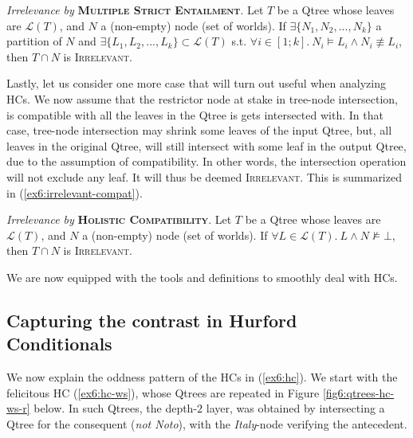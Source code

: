 \begin{exe}
	\ex\label{ex6:irrelevant-inter-complex} {\textit{Irrelevance by} \textsc{\textbf{Multiple Strict Entailment}}. Let $T$ be a Qtree whose leaves are $\mathcal{L}(T)$, and $N$ a (non-empty) node (set of worlds). If $\exists \lbrace N_1, N_2, ..., N_k \rbrace$ a partition of $N$ and $\exists \lbrace L_1, L_2, ..., L_k \rbrace \subset \mathcal{L}(T)$ s.t. $\forall i \in [1; k]. \ N_i \vDash L_i \wedge N_i \not\equiv L_i$, then $T\cap N$ is \textsc{Irrelevant}.}
\end{exe}

Lastly, let us consider one more case that will turn out useful when analyzing HCs. We now assume that the restrictor node at stake in tree-node intersection, is compatible with all the leaves in the Qtree is gets intersected with. In that case, tree-node intersection may shrink some leaves of the input Qtree, but, all leaves in the original Qtree, will still intersect with some leaf in the output Qtree, due to the assumption of compatibility. In other words, the intersection operation will not exclude any leaf. It will thus be deemed \textsc{Irrelevant}. This is summarized in (\ref{ex6:irrelevant-compat}). 

\begin{exe}
	\ex\label{ex6:irrelevant-compat} {\textit{Irrelevance by} \textsc{\textbf{Holistic Compatibility}}. Let $T$ be a Qtree whose leaves are $\mathcal{L}(T)$, and $N$ a (non-empty) node (set of worlds). If $\forall L \in \mathcal{L}(T). \ L \wedge N \not\vDash \bot$, then $T\cap N$ is \textsc{Irrelevant}.}
\end{exe}

We are now equipped with the tools and definitions to smoothly deal with HCs. 

\subsection{Capturing the contrast in Hurford Conditionals}

We now explain the oddness pattern of the HCs in (\ref{ex6:hc}). We start with the felicitous HC (\ref{ex6:hc-ws}), whose Qtrees are repeated in Figure \ref{fig6:qtrees-hc-ws-r} below. In such Qtrees, the depth-$2$ layer, was obtained by intersecting a Qtree for the consequent (\textit{not Noto}), with the \textit{Italy}-node verifying the antecedent. 

